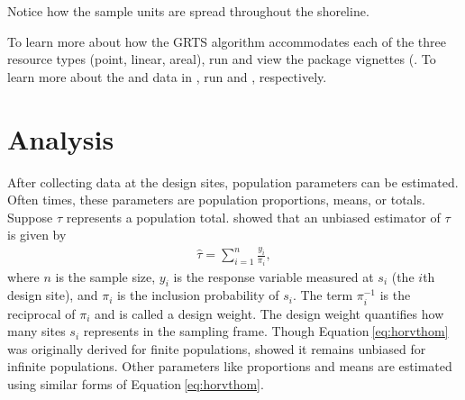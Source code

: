 \documentclass[
  shortnames]{jss}
\begin{document}
Notice how the sample units are spread throughout the shoreline.

To learn more about how the GRTS algorithm accommodates each of the
three resource types (point, linear, areal), run  and view
the package vignettes (. To learn
more about the  and  data in
, run  and ,
respectively.

\hypertarget{sec:analysis}{%
\section{Analysis}\label{sec:analysis}}

After collecting data at the design sites, population parameters can be
estimated. Often times, these parameters are population proportions,
means, or totals. Suppose \(\tau\) represents a population total.
\citet{horvitz1952generalization} showed that an unbiased estimator of
\(\tau\) is given by \begin{align}\label{eq:horvthom}
  \hat{\tau} = \sum_{i = 1}^n \frac{y_i}{\pi_i},
\end{align} where \(n\) is the sample size, \(y_i\) is the response
variable measured at \(s_i\) (the \(i\)th design site), and \(\pi_i\) is
the inclusion probability of \(s_i\). The term \(\pi_i^{-1}\) is the
reciprocal of \(\pi_i\) and is called a design weight. The design weight
quantifies how many sites \(s_i\) represents in the sampling frame.
Though Equation\(~\)\ref{eq:horvthom} was originally derived for finite
populations, \citet{cordy1993extension} showed it remains unbiased for
infinite populations. Other parameters like proportions and means are
estimated using similar forms of Equation\(~\)\ref{eq:horvthom}.
\end{document}
